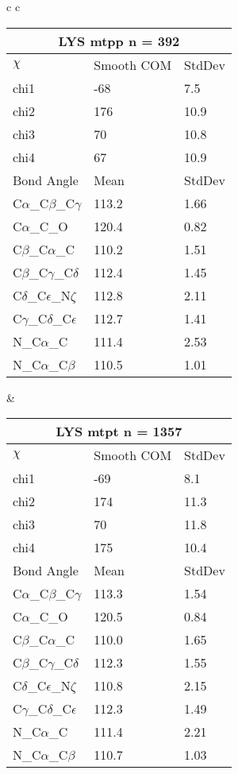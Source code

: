 \begin{longtable}{ c c }
  \begin{tabular}{ l l l }
  \toprule
  \multicolumn{3}{c}{LYS \textbf{mtpp} n = 392} \\ \toprule
  $\chi$       & Smooth COM & StdDev \\ \midrule
  chi1 & -68 & 7.5 \\ 
  chi2 & 176 & 10.9 \\ 
  chi3 & 70 & 10.8 \\ 
  chi4 & 67 & 10.9 \\ \midrule
  Bond Angle   & Mean     & StdDev \\ \midrule
  C$\alpha$\_C$\beta$\_C$\gamma$ & 113.2 & 1.66\\
  C$\alpha$\_C\_O & 120.4 & 0.82\\
  C$\beta$\_C$\alpha$\_C & 110.2 & 1.51\\
  C$\beta$\_C$\gamma$\_C$\delta$ & 112.4 & 1.45\\
  C$\delta$\_C$\epsilon$\_N$\zeta$ & 112.8 & 2.11\\
  C$\gamma$\_C$\delta$\_C$\epsilon$ & 112.7 & 1.41\\
  N\_C$\alpha$\_C & 111.4 & 2.53\\
  N\_C$\alpha$\_C$\beta$ & 110.5 & 1.01\\
  \bottomrule
  \end{tabular}
  &
  \begin{tabular}{ l l l }
  \toprule
  \multicolumn{3}{c}{LYS \textbf{mtpt} n = 1357} \\ \toprule
  $\chi$       & Smooth COM & StdDev \\ \midrule
  chi1 & -69 & 8.1 \\ 
  chi2 & 174 & 11.3 \\ 
  chi3 & 70 & 11.8 \\ 
  chi4 & 175 & 10.4 \\ \midrule
  Bond Angle   & Mean     & StdDev \\ \midrule
  C$\alpha$\_C$\beta$\_C$\gamma$ & 113.3 & 1.54\\
  C$\alpha$\_C\_O & 120.5 & 0.84\\
  C$\beta$\_C$\alpha$\_C & 110.0 & 1.65\\
  C$\beta$\_C$\gamma$\_C$\delta$ & 112.3 & 1.55\\
  C$\delta$\_C$\epsilon$\_N$\zeta$ & 110.8 & 2.15\\
  C$\gamma$\_C$\delta$\_C$\epsilon$ & 112.3 & 1.49\\
  N\_C$\alpha$\_C & 111.4 & 2.21\\
  N\_C$\alpha$\_C$\beta$ & 110.7 & 1.03\\

\end{tabular}
\end{longtable}
